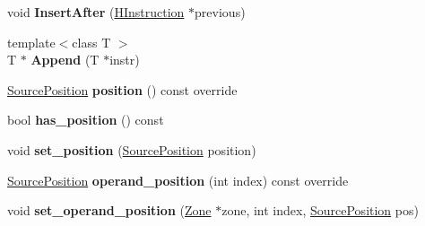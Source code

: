\begin{DoxyCompactItemize}
\item 
void {\bfseries Insert\+After} (\hyperlink{classv8_1_1internal_1_1_h_instruction}{H\+Instruction} $\ast$previous)\hypertarget{classv8_1_1internal_1_1_h_instruction_a400c1cad5a34fa123931d641721ae77f}{}\label{classv8_1_1internal_1_1_h_instruction_a400c1cad5a34fa123931d641721ae77f}

\item 
{\footnotesize template$<$class T $>$ }\\T $\ast$ {\bfseries Append} (T $\ast$instr)\hypertarget{classv8_1_1internal_1_1_h_instruction_ad065b646bfd3bd2626eda41a82fe55ce}{}\label{classv8_1_1internal_1_1_h_instruction_ad065b646bfd3bd2626eda41a82fe55ce}

\item 
\hyperlink{classv8_1_1internal_1_1_source_position}{Source\+Position} {\bfseries position} () const  override\hypertarget{classv8_1_1internal_1_1_h_instruction_a89d3b4379b4dbb9fd8339eb708783d56}{}\label{classv8_1_1internal_1_1_h_instruction_a89d3b4379b4dbb9fd8339eb708783d56}

\item 
bool {\bfseries has\+\_\+position} () const \hypertarget{classv8_1_1internal_1_1_h_instruction_a344ac3efbe9ec162686efc31d37c3b03}{}\label{classv8_1_1internal_1_1_h_instruction_a344ac3efbe9ec162686efc31d37c3b03}

\item 
void {\bfseries set\+\_\+position} (\hyperlink{classv8_1_1internal_1_1_source_position}{Source\+Position} position)\hypertarget{classv8_1_1internal_1_1_h_instruction_ab586463481b1b01b49858f91728d330c}{}\label{classv8_1_1internal_1_1_h_instruction_ab586463481b1b01b49858f91728d330c}

\item 
\hyperlink{classv8_1_1internal_1_1_source_position}{Source\+Position} {\bfseries operand\+\_\+position} (int index) const  override\hypertarget{classv8_1_1internal_1_1_h_instruction_a3d62639fbb9465b2b345f86f7d273e0b}{}\label{classv8_1_1internal_1_1_h_instruction_a3d62639fbb9465b2b345f86f7d273e0b}

\item 
void {\bfseries set\+\_\+operand\+\_\+position} (\hyperlink{classv8_1_1internal_1_1_zone}{Zone} $\ast$zone, int index, \hyperlink{classv8_1_1internal_1_1_source_position}{Source\+Position} pos)\hypertarget{classv8_1_1internal_1_1_h_instruction_a6f32ab46b64bbe5987883e1e5bc438fe}{}\label{classv8_1_1internal_1_1_h_instruction_a6f32ab46b64bbe5987883e1e5bc438fe}


\end{DoxyCompactItemize}

